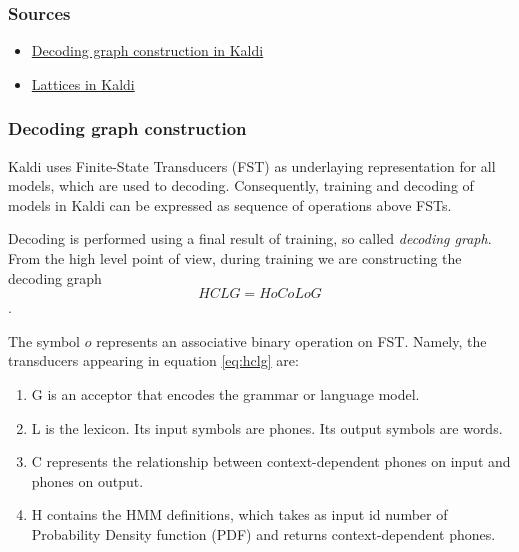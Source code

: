 \subsubsection*{Sources} %

\begin{itemize}
    \item \href{http://kaldi.sourceforge.net/graph.html} {Decoding graph construction in Kaldi}
    \item \href{http://kaldi.sourceforge.net/lattices.html} {Lattices in Kaldi}
\end{itemize}

\subsubsection*{Decoding graph construction} %
Kaldi uses Finite-State Transducers (FST) as underlaying representation for all models, which are used to decoding. Consequently, training and decoding of models in Kaldi can be expressed as sequence of operations above FSTs.

Decoding is performed using a final result of training, so called {\it decoding graph}. 
From the high level point of view,
during training we are constructing the decoding graph 
\begin{equation} \label{eq:hclg}
HCLG = H o C o L o G
\end{equation}.

The symbol $o$ represents an associative binary operation on FST.
Namely, the transducers appearing in equation \ref{eq:hclg} are:
\begin{enumerate}
    \item G is an acceptor that encodes the grammar or language model.
    \item L is the lexicon. Its input symbols are phones. Its output symbols are words.
    \item C represents the relationship between context-dependent phones on input and phones on output.
    \item H contains the HMM definitions, which takes as input id number of Probability Density function (PDF) and returns context-dependent phones.
\end{enumerate}

